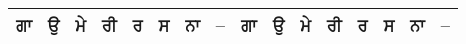 \documentclass[10pt]{article}
\begin{document}
\begin{table}[!htb]
{\begin{tabular}{llllllllllllllll}
\multicolumn{1}{|l|}{\textsf{ਗਾ}} & \multicolumn{1}{l|}{\textsf{ਉ}}  & \multicolumn{1}{l|}{\textsf{ਮੇ}}  & \multicolumn{1}{l|}{\textsf{ਰੀ}} & \multicolumn{1}{l|}{\textsf{ਰ}}   & \multicolumn{1}{l|}{\textsf{ਸ}} & \multicolumn{1}{l|}{\textsf{ਨਾ}} & \multicolumn{1}{l|}{\textsf{--}} & \multicolumn{1}{l|}{\textsf{ਗਾ}}  & \multicolumn{1}{l|}{\textsf{ਉ}}  & \multicolumn{1}{l|}{\textsf{ਮੇ}} & \multicolumn{1}{l|}{\textsf{ਰੀ}} & \multicolumn{1}{l|}{\textsf{ਰ}}  & \multicolumn{1}{l|}{\textsf{ਸ}}  & \multicolumn{1}{l|}{\textsf{ਨਾ}}  & \multicolumn{1}{l|}{\textsf{--}} \\ \hline
\end{tabular} } \quad
\end{table}
\end{document}
